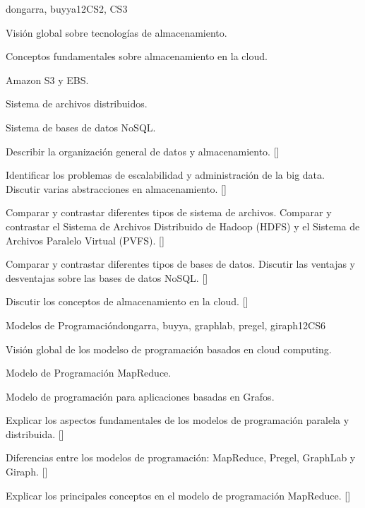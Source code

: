 \begin{syllabus}
\begin{unit}{\PDCloudComputing}{}{dongarra, buyya}{12}{CS2, CS3}
\begin{topics}
    \item \PDCloudComputingTopicCloudBased
    \item Visión global sobre tecnologías de almacenamiento.
    \item Conceptos fundamentales sobre almacenamiento en la cloud.
    \item Amazon S3 y EBS.
    \item Sistema de archivos distribuidos.
    \item Sistema de bases de datos NoSQL.
\end{topics}
\begin{learningoutcomes}
    \item Describir la organización general de datos y almacenamiento. [\Familiarity]
    \item Identificar los problemas de escalabilidad y administración de la big data. Discutir varias abstracciones en almacenamiento. [\Familiarity]
    \item Comparar y contrastar diferentes tipos de sistema de archivos. Comparar y contrastar el Sistema de Archivos Distribuido de Hadoop (HDFS) y el Sistema de Archivos Paralelo Virtual (PVFS).  [\Usage]
    \item Comparar y contrastar diferentes tipos de bases de datos. Discutir las ventajas y desventajas sobre las bases de datos NoSQL. [\Usage]
    \item Discutir los conceptos de almacenamiento en la cloud. [\Familiarity]
\end{learningoutcomes}
\end{unit}

\begin{unit}{Modelos de Programación}{}{dongarra, buyya, graphlab, pregel, giraph}{12}{CS6}
\begin{topics}
    \item Visión global de los modelso de programación basados en cloud computing.
    \item Modelo de Programación MapReduce.
    \item Modelo de programación para aplicaciones basadas en Grafos.
\end{topics}
\begin{learningoutcomes}
    \item Explicar los aspectos fundamentales de los modelos de programación paralela y distribuida. [\Familiarity]
    \item Diferencias entre los modelos de programación: MapReduce, Pregel, GraphLab y Giraph. [\Usage]
    \item Explicar los principales conceptos en el modelo de programación MapReduce.  [\Usage]
\end{learningoutcomes}
\end{unit}



\begin{coursebibliography}
\end{coursebibliography}

\end{syllabus}
